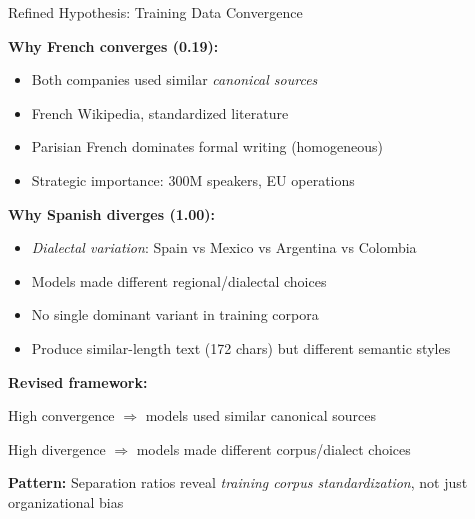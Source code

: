\documentclass[aspectratio=169,11pt]{beamer}
\begin{document}
\begin{frame}{Refined Hypothesis: Training Data Convergence}

\textbf{Why French converges (0.19):}
\begin{itemize}
  \item Both companies used similar \emph{canonical sources}
  \item French Wikipedia, standardized literature
  \item Parisian French dominates formal writing (homogeneous)
  \item Strategic importance: 300M speakers, EU operations
\end{itemize}

\vspace{0.5em}

\textbf{Why Spanish diverges (1.00):}
\begin{itemize}
  \item \emph{Dialectal variation}: Spain vs Mexico vs Argentina vs Colombia
  \item Models made different regional/dialectal choices
  \item No single dominant variant in training corpora
  \item Produce similar-length text (172 chars) but different semantic styles
\end{itemize}

\vspace{0.5em}

\textbf{Revised framework:}

High convergence $\Rightarrow$ models used similar canonical sources

High divergence $\Rightarrow$ models made different corpus/dialect choices

\vspace{0.5em}

\textbf{Pattern:} Separation ratios reveal \emph{training corpus standardization}, not just organizational bias

\end{frame}
\end{document}
